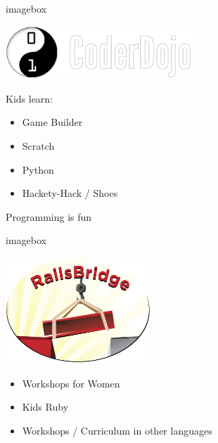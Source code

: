 \documentclass[20pt]{beamer}
\begin{document}
\begin{frame}
\begin{beamercolorbox}{imagebox}
\vspace{5mm}\par
\centering\includegraphics[height=2cm]{coderdojo_logo}\par
\vspace{5mm}\par
\end{beamercolorbox}
Kids learn:
\begin{itemize}
\item Game Builder
\item Scratch
\item Python
\item Hackety-Hack / Shoes
\end{itemize}
\end{frame}

\begin{frame}
\par{}Programming is fun
\end{frame}

\begin{frame}
\begin{beamercolorbox}{imagebox}
\vspace{2mm}\par
\centering\includegraphics[height=4cm]{railsbridge_logo}\par
\vspace{2mm}\par
\end{beamercolorbox}
\begin{itemize}
\item Workshops for Women
\item Kids Ruby
\item Workshops / Curriculum in other languages
\end{itemize}
\end{frame}
\end{document}
